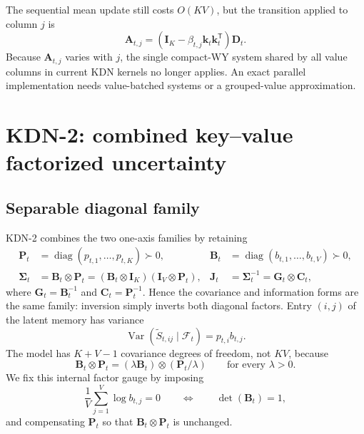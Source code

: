 \documentclass[11pt]{article}
\newcommand{\ve}[1]{\boldsymbol{#1}}
\newcommand{\tr}{\mathsf{T}}
\newcommand{\diag}{\operatorname{diag}}
\begin{document}
The sequential mean update still costs $O(KV)$, but the transition applied to column $j$ is
\begin{equation}
  \ve{A}_{t,j}
  =(\ve{I}_K-\beta_{t,j}\ve{k}_t\ve{k}_t^{\tr})\ve{D}_t.
  \label{eq:value-column-transition}
\end{equation}
Because $\ve{A}_{t,j}$ varies with $j$, the single compact-WY system shared by all value columns
in current KDN kernels no longer applies.  An exact parallel implementation needs value-batched
systems or a grouped-value approximation.

\section{KDN-2: combined key--value factorized uncertainty}
\label{sec:kdn2}

\subsection{Separable diagonal family}

KDN-2 combines the two one-axis families by retaining
\begin{equation}
\begin{aligned}
  \ve{P}_t&=\diag(p_{t,1},\ldots,p_{t,K})\succ0,
  &
  \ve{B}_t&=\diag(b_{t,1},\ldots,b_{t,V})\succ0,
  \\
  \ve{\Sigma}_t
  &=\ve{B}_t\otimes\ve{P}_t
   =(\ve{B}_t\otimes\ve{I}_K)
    (\ve{I}_V\otimes\ve{P}_t),
  &
  \ve{J}_t
  &=\ve{\Sigma}_t^{-1}
   =\ve{G}_t\otimes\ve{C}_t,
\end{aligned}
  \label{eq:kdn2-family}
\end{equation}
where $\ve{G}_t=\ve{B}_t^{-1}$ and $\ve{C}_t=\ve{P}_t^{-1}$.  Hence the covariance and
information forms are the same family: inversion simply inverts both diagonal factors.  Entry
$(i,j)$ of the latent memory has variance
\begin{equation}
  \operatorname{Var}(\widetilde S_{t,ij}\mid\mathcal{F}_t)=p_{t,i}b_{t,j}.
  \label{eq:kdn2-entry-variance}
\end{equation}
The model has $K+V-1$ covariance degrees of freedom, not $KV$, because
\begin{equation}
  \ve{B}_t\otimes\ve{P}_t
  =(\lambda\ve{B}_t)\otimes(\ve{P}_t/\lambda)
  \qquad\text{for every }\lambda>0.
  \label{eq:kdn2-factor-gauge}
\end{equation}
We fix this internal factor gauge by imposing
\begin{equation}
  \frac{1}{V}\sum_{j=1}^{V}\log b_{t,j}=0
  \qquad\Longleftrightarrow\qquad
  \det(\ve{B}_t)=1,
  \label{eq:kdn2-gauge-fix}
\end{equation}
and compensating $\ve{P}_t$ so that $\ve{B}_t\otimes\ve{P}_t$ is unchanged.
\end{document}
